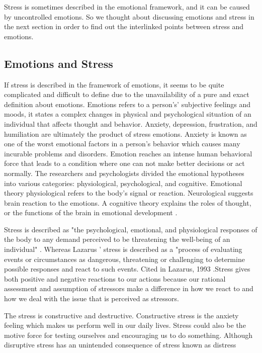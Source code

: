 Stress is sometimes described in the emotional framework, and it can be caused by uncontrolled emotions. So we thought about discussing emotions and stress in the next section in order to find out the interlinked points between stress and emotions. 

\subsection{Emotions and Stress}
If  stress  is  described  in  the  framework  of  emotions,  it  seems  to  be  quite  complicated  and difficult  to define  due  to the  unavailability  of  a  pure  and  exact  definition about  emotions. Emotions refers to a person's’ subjective feelings and moods, it states a complex changes in physical  and  psychological  situation  of  an  individual  that  affects  thought  and  behavior. Anxiety, depression, frustration, and humiliation are ultimately the product of stress emotions. Anxiety is known as one of the worst emotional factors in a person's behavior which causes many incurable problems and disorders. Emotion reaches an intense human behavioral force that leads to a condition where one can not make better decisions or act normally. The researchers and psychologists divided the emotional hypotheses into various categories: physiological, psychological, and cognitive.  Emotional theory physiological refers to the body's signal or reaction.  Neurological suggests brain reaction to the emotions. A cognitive theory explains the roles of thought, or the functions of the brain in emotional development \citep{Ashforth1995EmotionReappraisal}.

Stress is described as "the psychological, emotional, and physiological responses of the body to any demand perceived to be threatening the well-being of an individual" \citep{Bloisi2007ManagementBehaviour}. Whereas Lazarus ' stress is described as a "process of evaluating events or circumstances as dangerous, threatening or challenging to determine possible responses and react to such events. Cited in Lazarus, 1993 \citep{Bloisi2007ManagementBehaviour}.Stress gives both positive and negative reactions to our actions because our rational assessment and assumption of stressors make a difference in how we react to and how we deal with the issue that is perceived as stressors.

The stress is constructive and destructive. Constructive stress is the anxiety feeling which makes us perform well in our daily lives. Stress could also be the motive force for testing ourselves and encouraging us to do something. Although disruptive stress has an unintended consequence of stress known as distress \citep{Bloisi2007ManagementBehaviour}

